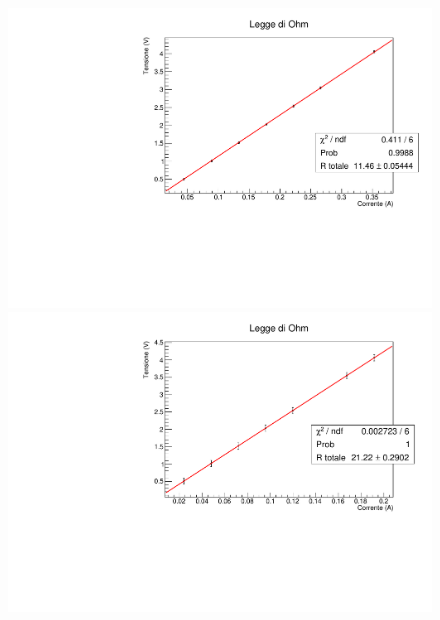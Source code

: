 \begin{figure}[h!]
    \centering
    \includegraphics[scale=.4]{Immagini/fit5.pdf}
    \\
    \includegraphics[scale=.4]{Immagini/fit6.pdf}
    \caption{}
    \label{fit 56}
\end{figure}